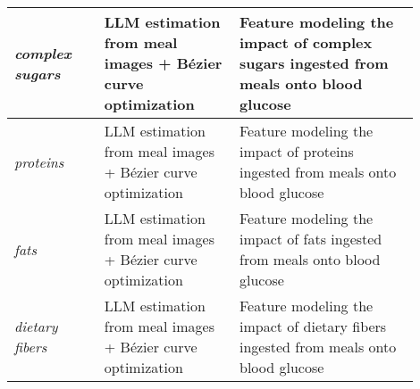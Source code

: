 \begin{table}[h]
\begin{tabular}{|p{0.2\linewidth}|p{0.3\linewidth}|p{0.4\linewidth}|}
\hline
\rowcolor{green!10} \textit{complex sugars} & LLM estimation from meal images + Bézier curve optimization & Feature modeling the impact of complex sugars ingested from meals onto blood glucose \\
\hline
\rowcolor{green!10} \textit{proteins} & LLM estimation from meal images + Bézier curve optimization & Feature modeling the impact of proteins ingested from meals onto blood glucose \\
\hline
\rowcolor{green!10} \textit{fats} & LLM estimation from meal images + Bézier curve optimization & Feature modeling the impact of fats ingested from meals onto blood glucose \\
\hline
\rowcolor{green!10} \textit{dietary fibers} & LLM estimation from meal images + Bézier curve optimization & Feature modeling the impact of dietary fibers ingested from meals onto blood glucose \\
\hline
\end{tabular}
\end{table} 